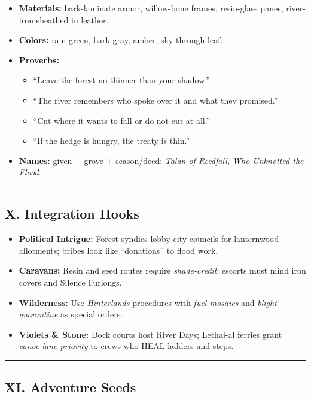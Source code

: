\documentclass[11pt]{article}
\begin{document}
\begin{itemize}[leftmargin=*]
  \item \textbf{Materials:} bark-laminate armor, willow-bone frames, resin-glass panes, river-iron sheathed in leather.
  \item \textbf{Colors:} rain green, bark gray, amber, sky-through-leaf.
  \item \textbf{Proverbs:}
    \begin{itemize}
      \item ``Leave the forest no thinner than your shadow.''
      \item ``The river remembers who spoke over it and what they promised.''
      \item ``Cut where it wants to fall or do not cut at all.''
      \item ``If the hedge is hungry, the treaty is thin.''
    \end{itemize}
  \item \textbf{Names:} given + grove + season/deed: \emph{Talan of Reedfall, Who Unknotted the Flood}.
\end{itemize}

\medskip\hrule\medskip

\subsection{X. Integration Hooks}

\begin{itemize}[leftmargin=*]
  \item \textbf{Political Intrigue:} Forest syndics lobby city councils for lanternwood allotments; bribes look like ``donations'' to flood work.
  \item \textbf{Caravans:} Resin and seed routes require \emph{shade-credit}; escorts must mind iron covers and Silence Furlongs.
  \item \textbf{Wilderness:} Use \emph{Hinterlands} procedures with \emph{fuel mosaics} and \emph{blight quarantine} as special orders.
  \item \textbf{Violets \& Stone:} Dock courts host River Days; Lethai-al ferries grant \emph{canoe-lane priority} to crews who HEAL ladders and steps.
\end{itemize}

\medskip\hrule\medskip

\subsection{XI. Adventure Seeds}
\end{document}
